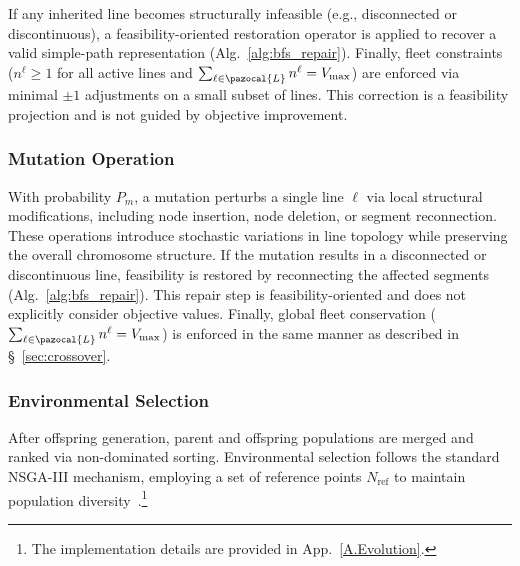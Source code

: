 \documentclass[a4paper,fleqn]{cas-sc}
\begin{document}
If any inherited line becomes structurally infeasible (e.g., disconnected or discontinuous), a feasibility-oriented restoration operator is applied to recover a valid simple-path representation (Alg.~\ref{alg:bfs_repair}).
%
Finally, fleet constraints ($n^\ell \ge 1$ for all active lines and $\sum_{\ell\in\pazocal{L}} n^\ell = V_{\max}$) are enforced via minimal $\pm 1$ adjustments on a small subset of lines.
This correction is a feasibility projection and is not guided by objective improvement.
\subsubsection{Mutation Operation}\label{sec:mutation}

With probability $P_m$, a mutation perturbs a single line $\ell$ via local structural modifications, including node insertion, node deletion, or segment reconnection.
These operations introduce stochastic variations in line topology while preserving the overall chromosome structure.
%
If the mutation results in a disconnected or discontinuous line,
feasibility is restored by reconnecting the affected segments (Alg.~\ref{alg:bfs_repair}).
This repair step is feasibility-oriented and does not explicitly consider objective values.
%
Finally, global fleet conservation ($\sum_{\ell\in\pazocal{L}} n^\ell = V_{\max}$)
is enforced in the same manner as described in \S~\ref{sec:crossover}.

\subsubsection{Environmental Selection}\label{sec:env_selection}
After offspring generation, parent and offspring populations are merged and ranked via non-dominated sorting.
%
Environmental selection follows the standard NSGA-III mechanism, employing a set of reference points $N_\text{ref}$ to maintain population diversity~\citep{deb2014nsga3}.\footnote{The implementation details are provided in App.~\ref{A.Evolution}.}
\end{document}
